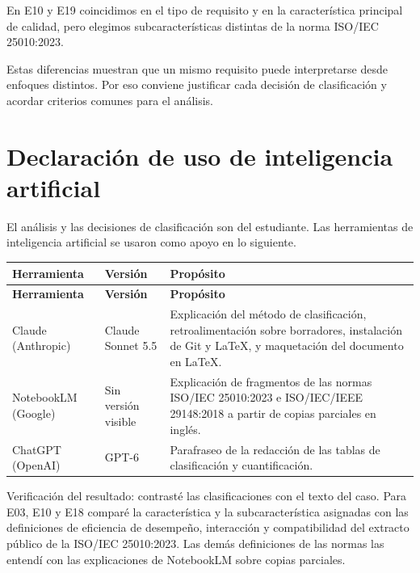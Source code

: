 \documentclass[11pt,a4paper]{article}
\begin{document}
En E10 y E19 coincidimos en el tipo de requisito y en la característica principal de calidad, pero elegimos subcaracterísticas distintas de la norma ISO/IEC 25010:2023.

Estas diferencias muestran que un mismo requisito puede interpretarse desde enfoques distintos. Por eso conviene justificar cada decisión de clasificación y acordar criterios comunes para el análisis.

\clearpage
\section{Declaración de uso de inteligencia artificial}

El análisis y las decisiones de clasificación son del estudiante. Las herramientas de inteligencia artificial se usaron como apoyo en lo siguiente.

{\small
\setlength{\tabcolsep}{4pt}
\begin{longtable}{L{3.6cm}L{3.2cm}L{7.4cm}}
\toprule
\textbf{Herramienta} & \textbf{Versión} & \textbf{Propósito} \\
\midrule
\endfirsthead
\toprule
\textbf{Herramienta} & \textbf{Versión} & \textbf{Propósito} \\
\midrule
\endhead
\bottomrule
\endfoot
Claude (Anthropic) & Claude Sonnet 5.5 & Explicación del método de clasificación, retroalimentación sobre borradores, instalación de Git y LaTeX, y maquetación del documento en LaTeX. \\
NotebookLM (Google) & Sin versión visible & Explicación de fragmentos de las normas ISO/IEC 25010:2023 e ISO/IEC/IEEE 29148:2018 a partir de copias parciales en inglés. \\
ChatGPT (OpenAI) & GPT-6 & Parafraseo de la redacción de las tablas de clasificación y cuantificación. \\
\end{longtable}
}

Verificación del resultado: contrasté las clasificaciones con el texto del caso. Para E03, E10 y E18 comparé la característica y la subcaracterística asignadas con las definiciones de eficiencia de desempeño, interacción y compatibilidad del extracto público de la ISO/IEC 25010:2023. Las demás definiciones de las normas las entendí con las explicaciones de NotebookLM sobre copias parciales.

\printbibliography
\end{document}

